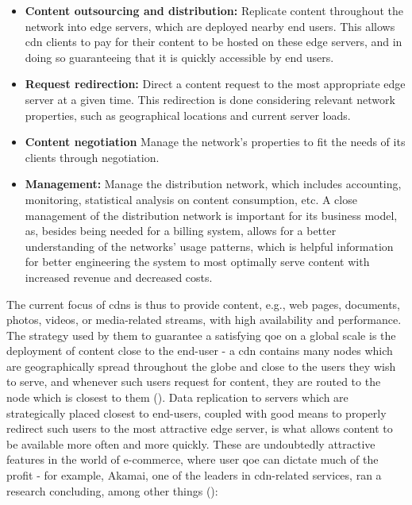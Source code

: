     \begin{itemize}
        \item \textbf{Content outsourcing and distribution:} Replicate content throughout the network into edge servers, which are deployed nearby end users.
            This allows \gls{cdn} clients to pay for their content to be hosted on these edge servers, and in doing so guaranteeing that it is quickly accessible by end users.
        \item \textbf{Request redirection:} Direct a content request to the most appropriate edge server at a given time.
            This redirection is done considering relevant network properties, such as geographical locations and current server loads.
        \item \textbf{Content negotiation} Manage the network's properties to fit the needs of its clients through negotiation.
        \item \textbf{Management:} Manage the distribution network, which includes accounting, monitoring, statistical analysis on content consumption, etc.
            A close management of the distribution network is important for its business model, as, besides being needed for a billing system, allows for a better understanding of the networks' usage patterns, which is helpful information for better engineering the system to most optimally serve content with increased revenue and decreased costs.
    \end{itemize}

    The current focus of \glspl{cdn} is thus to provide content, e.g., web pages, documents, photos, videos, or media-related streams, with high availability and performance.
    The strategy used by them to guarantee a satisfying \gls{qoe} on a global scale is the deployment of content close to the end-user - a \gls{cdn} contains many nodes which are geographically spread throughout the globe and close to the users they wish to serve, and whenever such users request for content, they are routed to the node which is closest to them (\cite{cookbook}).
    Data replication to servers which are strategically placed closest to end-users, coupled with good means to properly redirect such users to the most attractive edge server, is what allows content to be available more often and more quickly.
    These are undoubtedly attractive features in the world of e-commerce, where user \gls{qoe} can dictate much of the profit - for example, Akamai, one of the leaders in \gls{cdn}-related services, ran a research concluding, among other things (\cite{akamai}):

